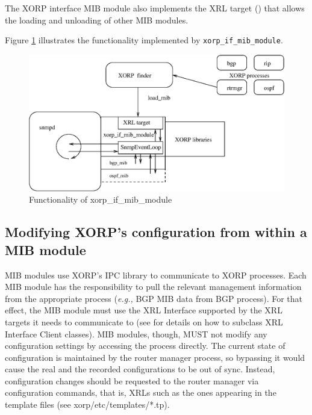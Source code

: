 \documentclass[11pt]{article}
\newcommand{\eg}{\emph{e.g.,}\xspace}
\begin{document}
The XORP interface MIB module also implements the XRL target (\cite{xorp:xrl})
that allows the loading and unloading of other MIB modules.  


Figure \ref{fig:xorp-if-diag} illustrates the functionality implemented by 
\texttt{xorp\_if\_mib\_module}.

\begin{figure}
  \begin{center}
    \includegraphics[width=1\textwidth]{figs/snmp_fig2}
  \end{center}
  \caption{Functionality of xorp\_if\_mib\_module}
  \label{fig:xorp-if-diag}
\end{figure}




\subsection{Modifying XORP's configuration from within a MIB module}


MIB modules use XORP's IPC library \cite{xorp:xrl} to communicate to XORP
processes.  Each MIB module has the responsibility to pull the relevant
management information from the appropriate process (\eg BGP MIB data from BGP
process).  For that effect, the MIB module must use the XRL Interface
supported by the XRL targets it needs to communicate to (see
\cite{xorp:xrl_interfaces} for details on how to subclass XRL Interface Client
classes).  MIB modules, though, MUST not modify any configuration settings by
accessing the process directly.  The current state of configuration is
maintained by the router manager process, so bypassing it would cause the real
and the recorded configurations to be out of sync.  Instead, configuration
changes should be requested to the router manager via configuration commands,
that is, XRLs such as the ones appearing in the template files (see
xorp/etc/templates/*.tp).
\end{document}

